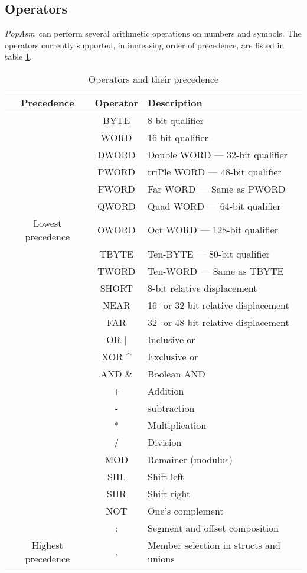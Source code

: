 \documentclass[a4paper,12pt]{book}
\newcommand{\popasm}{\emph{PopAsm}}
\begin{document}
\subsection{Operators}
\popasm\ can perform several arithmetic operations on numbers and symbols. The
operators currently supported, in increasing order of precedence, are listed in
table \ref{OPTAB}.

\begin{table}[h]
\begin{center}
\begin{tabular}[h]{ccl}
\hline
Precedence & Operator & Description\\
\hline
                   & BYTE & 8-bit qualifier\\
                   & WORD & 16-bit qualifier\\
                   & DWORD & Double WORD --- 32-bit qualifier\\
                   & PWORD & triPle WORD --- 48-bit qualifier\\
                   & FWORD & Far WORD --- Same as PWORD\\
                   & QWORD & Quad WORD --- 64-bit qualifier\\
Lowest precedence  & OWORD & Oct WORD --- 128-bit qualifier\\
                   & TBYTE & Ten-BYTE --- 80-bit qualifier\\
                   & TWORD & Ten-WORD --- Same as TBYTE\protect{\footnotemark}\\
                   & SHORT & 8-bit relative displacement\\
                   & NEAR & 16- or 32-bit relative displacement\\
                   & FAR & 32- or 48-bit relative displacement\\
\hline
                   & OR $\vert$ & Inclusive or\\
                   & XOR \^{} & Exclusive or\\
\hline
                   & AND \& & Boolean AND\\
\hline
                   & + & Addition\\
                   & - & subtraction\\
\hline
                   & * & Multiplication\\
                   & / & Division\\
                   & MOD & Remainer (modulus)\\
                   & SHL & Shift left\\
                   & SHR & Shift right\\
\hline
                   & NOT & One's complement\\
\hline
                   & : & Segment and offset composition\\
\hline
Highest precedence & . & Member selection in structs and unions\\
\hline
\end{tabular}
\caption{Operators and their precedence}
\label{OPTAB}
\end{center}
\end{table}
\end{document}
